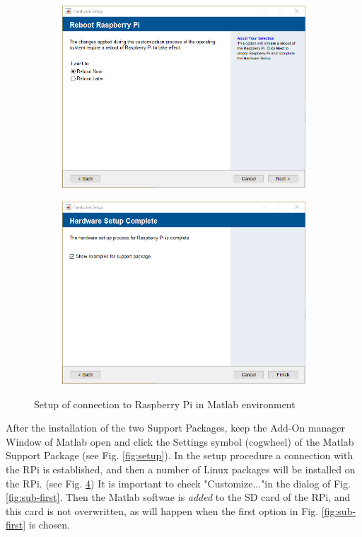\begin{figure}[ht]
\begin{subfigure}{.3\textwidth}
		\caption{}
		\label{fig:sub-seventh}
	\end{subfigure}
	\begin{subfigure}{.3\textwidth}
		\centering
		\includegraphics[width=.9\linewidth]{Pictures/Connect RPi 10.png}  
		\caption{}
		\label{fig:sub-eighth}
	\end{subfigure}
	\begin{subfigure}{.3\textwidth}
		\centering
		\includegraphics[width=.9\linewidth]{Pictures/Connect RPi 11.png}  
		\caption{}
		\label{fig:sub-ninth}
	\end{subfigure}
	\caption{Setup of connection to Raspberry Pi in Matlab environment}
	\label{fig:fig}
\end{figure}

After the installation of the two Support Packages, keep the Add-On manager Window of Matlab open and click the Settings symbol (cogwheel) of the Matlab Support Package (see Fig. \ref{fig:setup}). In the setup procedure a connection with the RPi is established, and then a number of Linux packages will be installed on the RPi. (see Fig. \ref{fig:fig}) It is important to check "Customize..."in the dialog of Fig. \ref{fig:sub-first}. Then the Matlab softwae is \emph{added} to the SD card of the RPi, and this card is not overwritten, as will happen when the first option in Fig. \ref{fig:sub-first} is chosen.

